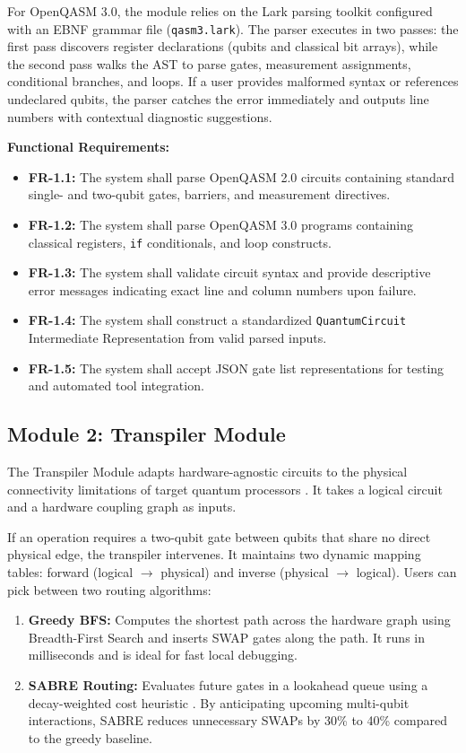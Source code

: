For OpenQASM 3.0, the module relies on the Lark parsing toolkit \cite{lark2023} configured with an EBNF grammar file (\texttt{qasm3.lark}). The parser executes in two passes: the first pass discovers register declarations (qubits and classical bit arrays), while the second pass walks the AST to parse gates, measurement assignments, conditional branches, and loops. If a user provides malformed syntax or references undeclared qubits, the parser catches the error immediately and outputs line numbers with contextual diagnostic suggestions.

\textbf{Functional Requirements:}
\begin{itemize}[leftmargin=*]
    \item \textbf{FR-1.1:} The system shall parse OpenQASM 2.0 circuits containing standard single- and two-qubit gates, barriers, and measurement directives.
    \item \textbf{FR-1.2:} The system shall parse OpenQASM 3.0 programs containing classical registers, \texttt{if} conditionals, and loop constructs.
    \item \textbf{FR-1.3:} The system shall validate circuit syntax and provide descriptive error messages indicating exact line and column numbers upon failure.
    \item \textbf{FR-1.4:} The system shall construct a standardized \texttt{QuantumCircuit} Intermediate Representation from valid parsed inputs.
    \item \textbf{FR-1.5:} The system shall accept JSON gate list representations for testing and automated tool integration.
\end{itemize}

\subsection{Module 2: Transpiler Module}

The Transpiler Module adapts hardware-agnostic circuits to the physical connectivity limitations of target quantum processors \cite{cowtan2019}. It takes a logical circuit and a hardware coupling graph as inputs.

If an operation requires a two-qubit gate between qubits that share no direct physical edge, the transpiler intervenes. It maintains two dynamic mapping tables: forward (logical $\to$ physical) and inverse (physical $\to$ logical). Users can pick between two routing algorithms:
\begin{enumerate}
    \item \textbf{Greedy BFS:} Computes the shortest path across the hardware graph using Breadth-First Search and inserts SWAP gates along the path. It runs in milliseconds and is ideal for fast local debugging.
    \item \textbf{SABRE Routing:} Evaluates future gates in a lookahead queue using a decay-weighted cost heuristic \cite{li2019sabre}. By anticipating upcoming multi-qubit interactions, SABRE reduces unnecessary SWAPs by 30\% to 40\% compared to the greedy baseline.
\end{enumerate}

